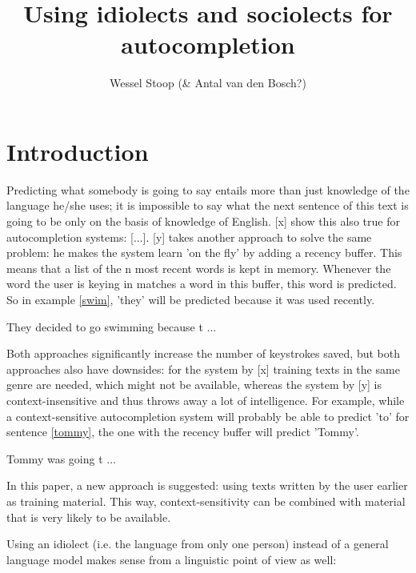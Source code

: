 \documentclass[11pt]{article}
\title{Using idiolects and sociolects for autocompletion}
\author{Wessel Stoop (\& Antal van den Bosch?)}
\date{}
\begin{document}
\maketitle

\begin{abstract}

\end{abstract}

\section{Introduction}
Predicting what somebody is going to say entails more than just knowledge of the language he/she uses; it is impossible to say what the next sentence of this text is going to be only on the basis of knowledge of English. [x] show this also true for autocompletion systems: [...]. [y] takes another approach to solve the same problem: he makes the system learn 'on the fly' by adding a recency buffer. This means that a list of the n most recent words is kept in memory. Whenever the word the user is keying in matches a word in this buffer, this word is predicted. So in example \ref{swim}, 'they' will be predicted because it was used recently.

\begin{examples} \label{swim}
\item They decided to go swimming because t ...
\end{examples}

Both approaches significantly increase the number of keystrokes saved, but both approaches also have downsides: for the system by [x] training texts in the same genre are needed, which might not be available, whereas the system by [y] is context-insensitive and thus throws away a lot of intelligence. For example, while a context-sensitive autocompletion system will probably be able to predict 'to' for sentence \ref{tommy}, the one with the recency buffer will predict 'Tommy'.

\begin{examples} 
\item Tommy was going t ... \label{tommy}
\end{examples}

In this paper, a new approach is suggested: using texts written by the user earlier as training material. This way, context-sensitivity can be combined with material that is very likely to be available.

Using an idiolect (i.e. the language from only one person) instead of a general language model makes sense from a linguistic point of view as well:
\end{document}
